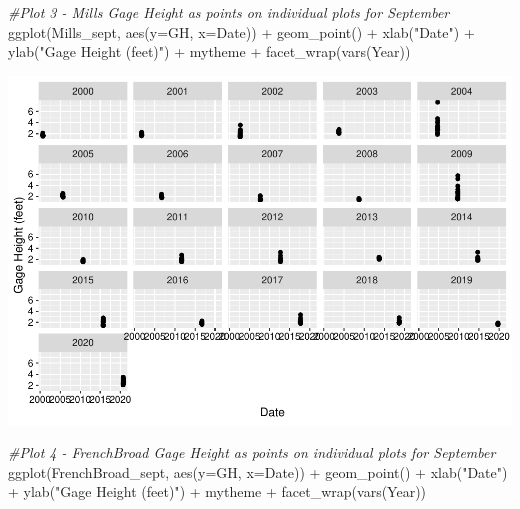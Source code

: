 \documentclass[
  12pt,
]{article}
\newenvironment{Shaded}{\begin{snugshade}}{\end{snugshade}}
\newcommand{\AttributeTok}[1]{\textcolor[rgb]{0.77,0.63,0.00}{#1}}
\newcommand{\CommentTok}[1]{\textcolor[rgb]{0.56,0.35,0.01}{\textit{#1}}}
\newcommand{\FunctionTok}[1]{\textcolor[rgb]{0.00,0.00,0.00}{#1}}
\newcommand{\NormalTok}[1]{#1}
\newcommand{\SpecialCharTok}[1]{\textcolor[rgb]{0.00,0.00,0.00}{#1}}
\newcommand{\StringTok}[1]{\textcolor[rgb]{0.31,0.60,0.02}{#1}}
\begin{document}
\begin{Shaded}
\begin{Highlighting}[]
\CommentTok{\#Plot 3 {-} Mills Gage Height as points on individual plots for September}
\FunctionTok{ggplot}\NormalTok{(Mills\_sept, }\FunctionTok{aes}\NormalTok{(}\AttributeTok{y=}\NormalTok{GH, }\AttributeTok{x=}\NormalTok{Date)) }\SpecialCharTok{+}
  \FunctionTok{geom\_point}\NormalTok{() }\SpecialCharTok{+}
  \FunctionTok{xlab}\NormalTok{(}\StringTok{"Date"}\NormalTok{) }\SpecialCharTok{+}
  \FunctionTok{ylab}\NormalTok{(}\StringTok{"Gage Height (feet)"}\NormalTok{) }\SpecialCharTok{+}
\NormalTok{  mytheme }\SpecialCharTok{+}
  \FunctionTok{facet\_wrap}\NormalTok{(}\FunctionTok{vars}\NormalTok{(Year)) }
\end{Highlighting}
\end{Shaded}

\includegraphics{Project_Template_files/figure-latex/Plots-3.pdf}

\begin{Shaded}
\begin{Highlighting}[]
\CommentTok{\#Plot 4 {-} FrenchBroad Gage Height as points on individual plots for September}
\FunctionTok{ggplot}\NormalTok{(FrenchBroad\_sept, }\FunctionTok{aes}\NormalTok{(}\AttributeTok{y=}\NormalTok{GH, }\AttributeTok{x=}\NormalTok{Date)) }\SpecialCharTok{+}
  \FunctionTok{geom\_point}\NormalTok{() }\SpecialCharTok{+}
  \FunctionTok{xlab}\NormalTok{(}\StringTok{"Date"}\NormalTok{) }\SpecialCharTok{+}
  \FunctionTok{ylab}\NormalTok{(}\StringTok{"Gage Height (feet)"}\NormalTok{) }\SpecialCharTok{+}
\NormalTok{  mytheme }\SpecialCharTok{+}
  \FunctionTok{facet\_wrap}\NormalTok{(}\FunctionTok{vars}\NormalTok{(Year)) }
\end{Highlighting}
\end{Shaded}
\end{document}
